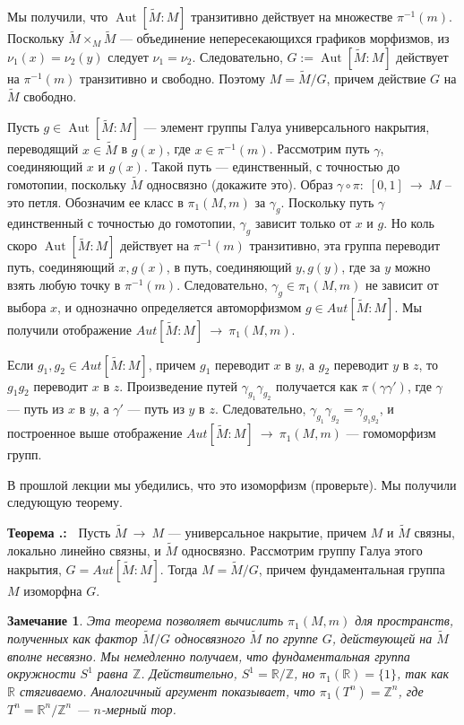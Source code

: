 \documentclass[12pt]{book}
\newcommand{\arrow}{{\:\longrightarrow\:}}
\def\endproof{\hbox{\vrule width 5pt height 5pt depth 0pt}}
\def\Aut{\operatorname{Aut}}
\def\Z{{\mathbb Z}}
\def\R{{\mathbb R}}
\theoremstyle{upshape}
\newtheorem{zadacha}{Задача}[chapter]
\theoremstyle{generic}
\newtheorem{remark}[teorema]{Замечание}
\def\замечание{\begin{remark}}
\def\еза{\end{remark}}
\theoremstyle{upshapenonumber}
\newcommand{\следствие}{%
     \refstepcounter{teorema}
     {\noindent\bf Следствие \thechapter.\arabic{teorema}:\ }}
\newcommand{\пример}{%
     \refstepcounter{teorema}
     {\noindent\bf Пример \thechapter.\arabic{teorema}:\ }}
\newcommand{\лемма}{%
     \refstepcounter{teorema}
     {\noindent\bf Лемма \thechapter.\arabic{teorema}:\ }}
\newcommand{\теорема}{%
     \refstepcounter{teorema}
     {\noindent\bf Теорема \thechapter.\arabic{teorema}:\ }}
\newcommand{\утверждение}{%
     \refstepcounter{teorema}
     {\noindent\bf Утверждение \thechapter.\arabic{teorema}:\ }}
\def\хфилл{\hfill}
\def\ем{\em}
\def\задача{\begin{zadacha}}
\def\ез{\end{zadacha}}
\def\еу{\end{ukazanie}}
\def\ео{\end{opredelenie}}
\def\енум{\begin{enumerate}}
\def\ее{\end{enumerate}}
\begin{document}
Мы получили, что $\Aut[\tilde M: M]$ транзитивно действует
на множестве $\pi^{-1}(m)$. Поскольку 
$\tilde M\times_M\tilde M$ --- объединение непересекающихся
графиков морфизмов, из $\nu_1(x)=\nu_2(y)$ следует
$\nu_1=\nu_2$. Следовательно, $G:=\Aut[\tilde M: M]$
действует на $\pi^{-1}(m)$ транзитивно и свободно.
Поэтому $M = \tilde M/G$, причем действие $G$ на
$\tilde M$ свободно.

Пусть $g\in \Aut[\tilde M: M]$ --- элемент группы Галуа
универсального накрытия, переводящий $x\in \tilde M$ в $g(x)$,
где $x\in \pi^{-1}(m)$.
Рассмотрим путь $\gamma$, соединяющий $x$ и $g(x)$.
Такой путь --- единственный, с точностью до гомотопии,
поскольку $\tilde M$ односвязно (докажите это).
Образ $\gamma \circ\pi:\; [0,1] \arrow M$ --
это петля. Обозначим ее класс в $\pi_1(M,m)$
за $\gamma_g$. Поскольку путь $\gamma$ единственный
с точностью до гомотопии, $\gamma_g$
зависит только от $x$ и $g$. Но коль скоро $\Aut[\tilde M: M]$
действует на $\pi^{-1}(m)$ транзитивно, эта группа
переводит путь, соединяющий $x, g(x)$, в путь, соединяющий
$y, g(y)$, где за $y$ можно взять любую точку в $\pi^{-1}(m)$.
Следовательно, $\gamma_g\in \pi_1(M,m)$
не зависит от выбора $x$, и однозначно
определяется автоморфизмом $g\in Aut[\tilde M: M]$.
Мы получили отображение $Aut[\tilde M: M]\arrow \pi_1(M,m)$.

Если $g_1, g_2\in Aut[\tilde M: M]$,
причем $g_1$ переводит $x$ в $y$, а $g_2$ переводит $y$ в
$z$, то $g_1g_2$ переводит $x$ в $z$. Произведение
путей $\gamma_{g_1}\gamma_{g_2}$ получается как 
$\pi(\gamma\gamma')$, где $\gamma$ --- путь
из $x$ в $y$, а $\gamma'$ --- путь из $y$ в $z$.
Следовательно, $\gamma_{g_1}\gamma_{g_2}=\gamma_{g_1g_2}$,
и построенное выше отображение 
$Aut[\tilde M: M]\arrow \pi_1(M,m)$ --- гомоморфизм групп.

В прошлой лекции мы убедились, что это изоморфизм
(проверьте). Мы получили следующую теорему.

\хфилл

\теорема
Пусть $\tilde M  \arrow M$ --- универсальное накрытие,
причем $M$ и $\tilde M$ связны, локально линейно связны,
и $\tilde M$ односвязно. Рассмотрим группу Галуа этого накрытия,
$G=Aut[\tilde M: M]$. Тогда $M = \tilde M /G$, причем
фундаментальная группа $M$ изоморфна $G$.

\endproof


\замечание
Эта теорема позволяет вычислить $\pi_1(M,m)$ для 
пространств, полученных как фактор $\tilde M/G$
односвязного $\tilde M$ по группе $G$, действующей
на $\tilde M$ вполне несвязно.
Мы немедленно получаем, что фундаментальная
группа окружности $S^1$ равна $\Z$. Действительно,
$S^1= \R /\Z$, но $\pi_1(\R)=\{1\}$, так как $\R$
стягиваемо. Аналогичный аргумент показывает, что
$\pi_1(T^n)=\Z^n$, где $T^n=\R^n /\Z^n$ --- $n$-мерный тор.
\еза
\end{document}
